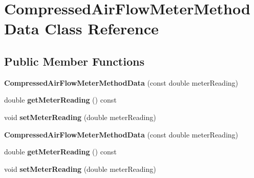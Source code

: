 \hypertarget{class_compressed_air_flow_meter_method_data}{}\section{Compressed\+Air\+Flow\+Meter\+Method\+Data Class Reference}
\label{class_compressed_air_flow_meter_method_data}
\subsection*{Public Member Functions}
\begin{DoxyCompactItemize}
\item 
\mbox{\label{class_compressed_air_flow_meter_method_data_a3fcffd72dbb1c66be58f20a6fec227b0}} 
{\bfseries Compressed\+Air\+Flow\+Meter\+Method\+Data} (const double meter\+Reading)
\item 
\mbox{\label{class_compressed_air_flow_meter_method_data_a0223a4ebc902479f37109d44184db699}} 
double {\bfseries get\+Meter\+Reading} () const
\item 
\mbox{\label{class_compressed_air_flow_meter_method_data_ab3c6df2e174416aa5fa0a4357030e825}} 
void {\bfseries set\+Meter\+Reading} (double meter\+Reading)
\item 
\mbox{\label{class_compressed_air_flow_meter_method_data_a3fcffd72dbb1c66be58f20a6fec227b0}} 
{\bfseries Compressed\+Air\+Flow\+Meter\+Method\+Data} (const double meter\+Reading)
\item 
\mbox{\label{class_compressed_air_flow_meter_method_data_a0223a4ebc902479f37109d44184db699}} 
double {\bfseries get\+Meter\+Reading} () const
\item 
\mbox{\label{class_compressed_air_flow_meter_method_data_ab3c6df2e174416aa5fa0a4357030e825}} 
void {\bfseries set\+Meter\+Reading} (double meter\+Reading)
\item 
\mbox{\label{class_compressed_air_flow_meter_method_data_a3fcffd72dbb1c66be58f20a6fec227b0}} 

\end{DoxyCompactItemize}
